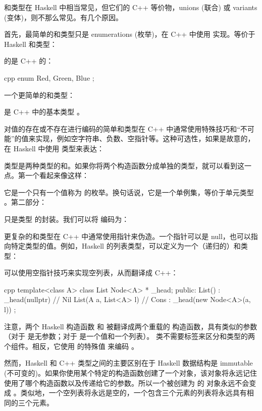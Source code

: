 和类型在 Haskell 中相当常见，但它们的 C++ 等价物，unions (联合) 或 variants (变体)，则不那么常见。有几个原因。

首先，最简单的和类型只是 enumerations (枚举)，在 C++ 中使用  实现。等价于 Haskell 和类型：

的是 C++ 的：

\begin{snip}{cpp}
enum { Red, Green, Blue };
\end{snip}
一个更简单的和类型：

是 C++ 中的基本类型 。

对值的存在或不存在进行编码的简单和类型在 C++ 中通常使用特殊技巧和“不可能”的值来实现，例如空字符串、负数、空指针等。这种可选性，如果是故意的，在 Haskell 中使用  类型来表达：

 类型是两种类型的和。如果你将两个构造函数分成单独的类型，就可以看到这一点。第一个看起来像这样：

它是一个只有一个值称为  的枚举。换句话说，它是一个单例集，等价于单元类型 \code{()}。第二部分：

只是类型  的封装。我们可以将  编码为：

更复杂的和类型在 C++ 中通常使用指针来伪造。一个指针可以是 null，也可以指向特定类型的值。例如，Haskell 的列表类型，可以定义为一个（递归的）和类型：

可以使用空指针技巧来实现空列表，从而翻译成 C++：

\begin{snip}{cpp}
template<class A>
class List {
    Node<A> * _head;
public:
    List() : _head(nullptr) {} // Nil
    List(A a, List<A> l)       // Cons
      : _head(new Node<A>(a, l))
    {}
};
\end{snip}
注意，两个 Haskell 构造函数  和  被翻译成两个重载的  构造函数，具有类似的参数（对于  是无参数；对于  是一个值和一个列表）。 类不需要标签来区分和类型的两个组件。相反，它使用  的特殊值  来编码 。

然而，Haskell 和 C++ 类型之间的主要区别在于 Haskell 数据结构是 immutable (不可变的)。如果你使用某个特定的构造函数创建了一个对象，该对象将永远记住使用了哪个构造函数以及传递给它的参数。所以一个被创建为  的  对象永远不会变成 。类似地，一个空列表将永远是空的，一个包含三个元素的列表将永远具有相同的三个元素。

